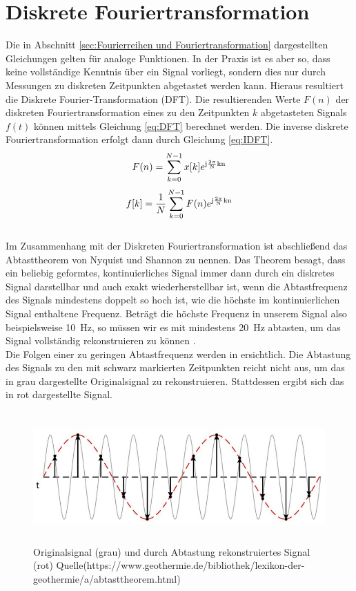 \section{Diskrete Fouriertransformation}
\label{sec.Diskrete Fouriertransformation}
Die in Abschnitt \ref{sec:Fourierreihen und Fouriertransformation} dargestellten Gleichungen gelten für analoge Funktionen. In der Praxis ist es aber so, dass keine vollständige Kenntnis über ein Signal vorliegt, sondern dies nur durch Messungen zu diskreten Zeitpunkten abgetastet werden kann. Hieraus resultiert die Diskrete Fourier-Transformation (DFT). Die resultierenden Werte $F(n)$ der diskreten Fouriertransformation eines zu den Zeitpunkten $k$ abgetasteten Signals $f(t)$ können mittels Gleichung \ref{eq:DFT} berechnet werden. Die inverse diskrete Fouriertransformation erfolgt dann durch Gleichung \ref{eq:IDFT}.
\begin{equation}
	\label{eq:DFT}
	F(n) = \sum_{k=0}^{N-1}x[k]e^{\mathrm{j\frac{2\pi}{N}kn}}
\end{equation}
\begin{equation}
	\label{eq:IDFT}
	f[k] = \frac{1}{N}\sum_{k=0}^{N-1}F(n)e^{\mathrm{j\frac{2\pi}{N}kn}}
\end{equation} \\
Im Zusammenhang mit der Diskreten Fouriertransformation ist abschließend das Abtasttheorem von Nyquist und Shannon zu nennen. Das Theorem besagt, dass ein beliebig geformtes, kontinuierliches Signal immer dann durch ein diskretes Signal darstellbar und auch exakt wiederherstellbar ist, wenn die Abtastfrequenz des Signals mindestens doppelt so hoch ist, wie die höchste im kontinuierlichen Signal enthaltene Frequenz. Beträgt die höchste Frequenz in unserem Signal also beispielsweise \SI{10}{\Hz}, so müssen wir es mit mindestens \SI{20}{\Hz} abtasten, um das Signal vollständig rekonstruieren zu können  \cite{Wendemuth.2005}. \\
Die Folgen einer zu geringen Abtastfrequenz werden in  ersichtlich. Die Abtastung des Signals zu den mit schwarz markierten Zeitpunkten reicht nicht aus, um das in grau dargestellte Originalsignal zu rekonstruieren. Stattdessen ergibt sich das in rot dargestellte Signal.
\begin{figure}[!ht]
	\begin{center}
		\includegraphics[height=50mm]{Abbildungen/grundlagen/abtasttheorem}
		\caption{Originalsignal (grau) und durch Abtastung rekonstruiertes Signal (rot) Quelle(https://www.geothermie.de/bibliothek/lexikon-der-geothermie/a/abtasttheorem.html)}
		\label{fig.Abtasttheorem}
	\end{center}
\end{figure}
